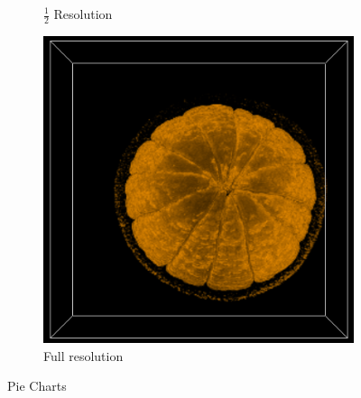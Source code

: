 \documentclass[a4paper,twoside,11pt]{article}
\begin{document}
\begin{figure}[h!]
\begin{center}
\begin{subfigure}[b]{0.3\textwidth}
                \caption{$\frac{1}{2}$ Resolution}
                \label{fig:res2}
        \end{subfigure}
        \begin{subfigure}[b]{0.3\textwidth}
                \includegraphics[width=\textwidth]{Images/res1.png}
                \caption{Full resolution}
                \label{fig:res1}
        \end{subfigure}
        \caption{Pie Charts}\label{fig:Resolutions}
\end{center}
\end{figure}

\newpage
\end{document}
